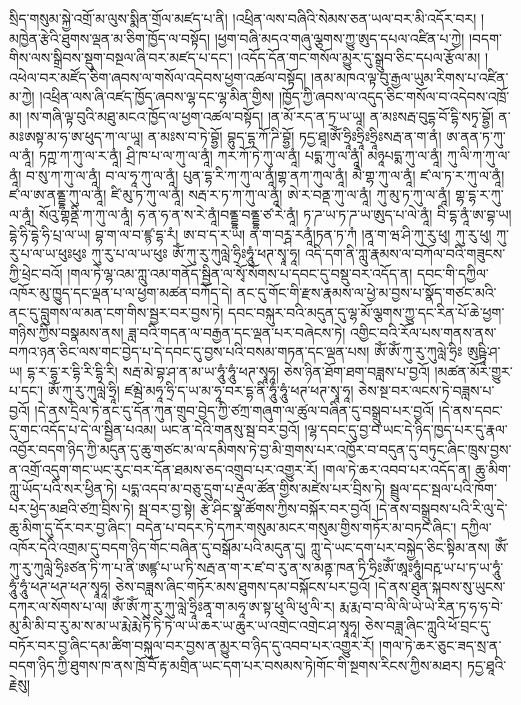 སྲིད་གསུམ་སྐྱེ་འགྲོ་མ་ལུས་སྨིན་གྲོལ་མཛད་པ་ནི། །འཕྲིན་ལས་བཞིའི་སེམས་ཅན་ཡལ་བར་མི་འདོར་བར། །མཁྱེན་རྩེའི་ཐུགས་ལྡན་མ་ཅིག་ཁྱོད་ལ་བསྟོད། །ཕྱག་བཞི་མདའ་གཞུ་ལྕགས་ཀྱུ་ཨུད་དཔལ་འཛིན་པ་ཀྱེ། །བདག་གིས་ལས་སྒྲིབས་སྡུག་བསྔལ་ཞི་བར་མཛད་པ་དང་། །འདོད་དོན་གང་གསོལ་མྱུར་དུ་སྒྲུབ་ཅིང་དཔལ་རྩོལ་མ། །འཕེལ་བར་མཛོད་ཅིག་ཞབས་ལ་གསོལ་འདེབས་ཕྱག་འཚལ་བསྟོད། །ནམ་མཁའ་ལྟ་བུ་རྒྱལ་ཡུམ་རིགས་པ་འཛིན་མ་ཀྱེ། །འཕྲིན་ལས་ཞི་འཛད་ཁྱོད་ཞབས་ལྷ་དང་ལྷ་མིན་གྱིས། །ཁྱོད་ཀྱི་ཞབས་ལ་འདུད་ཅིང་གསོལ་བ་འདེབས་འཁྲོ་མ། །ས་གཞི་ལྟ་བུའི་མཐུ་མངའ་ཁྱོད་ལ་ཕྱག་འཚལ་བསྟོད། །ན་མོ་རད་ན་ཏྲ་ཡ་ཡཱ། ན་མཿསརྦ་བུདྷ་བོ་དྷི་སཏྭ་བྷྱོ། ན་མཿཨསྟ་མ་ཧ་ཨ་ཕུད་ཀ་ལ་ཡཱ། ན་མཿས་བ་ཏེ་བྷྱོ། བྷུད་དྷ་ཀོ་ཌི་བྷྱོ། ཏདྱ་ཐཱ།ཨོཾ་ཧྲཱིཿཧྲཱིཿཧྲཱིཿསརྦ་ན་ག་ནཾ། ཨ་ནན་ཏ་ཀུ་ལ་ནཱཾ། ཏཀྵ་ཀ་ཀུ་ལ་ར་ནཱཾ། ཤྲི་ཁ་པ་ལ་ཀུ་ལ་ནཱཾ། ཀར་ཀོ་ཏེ་ཀུ་ལ་ནཱཾ། པདྨ་ཀུ་ལ་ནཱཾ། མཉཱཔདྨ་ཀུ་ལ་ནཱཾ། ཀུ་ལི་ཀ་ཀུ་ལ་ནཱཾ། བ་སུ་ཀ་ཀུ་ལ་ནཱཾ། བ་ལ་ཧཱ་ཀུ་ལ་ནཱཾ། པུན་དྷ་རི་ཀ་ཀུ་ལ་ནཱཾ།གྷ་ནཀ་ཀུལ་ནཱཾ། མཻ་གྷ་ཀུ་ལ་ནཱཾ། ཛ་ལ་ཏ་ར་ཀུ་ལ་ནཱཾ། ཛ་ལ་ཨ་ནནྡྷ་ཀུ་ལ་ནཱཾ། ཛི་མུ་ཏ་ཀུ་ལ་ནཱཾ། སརྦ་ར་ཏ་ཀ་ཀུ་ལ་ནཱཾ། ཨེ་ར་བནྡ་ཀུ་ལ་ནཱཾ། ཀུ་མུ་ཏ་ཀུ་ལ་ནཱཾ། གྷ་དྷ་ར་ཀུ་ལ་ནཱཾ། སོའུ་གྷནྡི་ཀ་ཀུ་ལ་ནཱཾ། ཧ་ན་ཧ་ན་ས་རེ་ནཱཾ།བནྡྷ་བནྡྷ་ཙ་རེ་ནཱཾ། ཏ་ཌ་ཡ་ཏ་ཌ་ཡ་ཨུད་པ་ལེ་ནཱཾ། བི་དྷ་ནཱཾ་ཨ་བྷ་ཡ། དྷེ་ཧི་དྷེ་ཧི་པྲ་ལ་ཡ། བྷ་ག་ལ་བ་ཛྙ་དྷ་རཾ། ཨ་བ་ད་ར་ཡ། ན་ག་བཪྴ་རནཱཾ།ཏན་ཏ་ཀཾ །ནཱ་ག་ཝ་ཤི་ཀུ་རུ་ཕུ། ཀུ་རུ་ཕུ། ཀུ་རུ་པ་ལ་ཡ་ཕུཿཕུཿ ཀུ་རུ་པ་ལ་ཡ་ཕུཿ ཨོཾ་ཀུ་རུ་ཀུལླེ་ཧྲིཿཧཱུཾ་ཕཊ་སྭཱ་ཧཱ། འདི་དག་ནི་ཀླུ་རྣམས་ལ་བཀོལ་བའི་གཟུངས་ཀྱི་ཕྲེང་བའོ། །གལ་ཏེ་ལྷ་འམ་ཀླུ་འམ་གནོད་སྦྱིན་ལ་སྭོ་སོགས་པ་དབང་དུ་བསྡུ་བར་འདོད་ན། དབང་གི་དཀྱིལ་འཁོར་མུ་ཁྱུད་དང་ལྡན་པ་ལ་ཕྱག་མཚན་བཀོད་དེ། ནང་དུ་གོང་གི་རྫས་རྣམས་ལ་ཕྱེ་མ་བྱས་པ་སྣོད་གཙང་མའི་ནང་དུ་བླུགས་ལ་མན་ངག་གིས་སྦྱར་བར་བྱས་ཏེ། དབང་བསྐུར་བའི་མདུན་དུ་ལྷ་མོ་ལྕགས་ཀྱུ་དང་རིན་པོ་ཆེ་ཕྱག་གཉིས་ཀྱིས་བསྣམས་ནས། ཟླ་བའི་གདན་ལ་བརྒྱན་དང་ལྡན་པར་བཞེངས་ཏེ། འགྱིང་བའི་རོལ་པས་གནས་ནས་བཀའ་ཉན་ཅིང་ལས་གང་བྱེད་པ་དེ་དབང་དུ་བྱས་པའི་བསམ་གཏན་དང་ལྡན་པས། ཨོཾ་ཨོཾ་ཀུ་རུ་ཀུལླེ་ཧྲིཿ ཨུཥྟཱི་ཤ་ཡ། དྷ་ར་དྷ་ར་དྷི་རི་དྷི་རི། སརྦ་མེ་བྷ་ཤ་ན་མ་ཡ་ཧཱུཾ་ཧཱུཾ་ཕཊ་སྭཱཧཱ། ཅེས་ཉིན་ཐོག་ཐག་བཟླས་པ་བྱའོ། །མཚན་མོར་གྱུར་པ་དང་། ཨོཾ་ཀུ་རུ་ཀུལླེ་ཧྲཱི། ཛམྦེ་མཧཱ་ཧྲི་ད་ཡ་མ་ཧཱ་བར་དྷ་ནི་ཧཱུཾ་ཧཱུཾ་ཕཊ་ཕཊ་སྭཱ་ཧཱ། ཅེས་སྔ་བར་ལངས་ཏེ་བཟླས་པ་བྱའོ། །དེ་ནས་དྲིལ་ཏེ་ནང་དུ་དོན་ཀུན་གྲུབ་བྱེད་ཀྱི་ཙཀྲ་གཞུག་ལ་ཚུལ་བཞིན་དུ་བསྒྲུབ་པར་བྱའོ། །དེ་ནས་དབང་དུ་གང་འདོད་པ་དེ་ལ་སྦྱིན་པའམ། ཡང་ན་དེའི་གནསུ་སྦ་བར་བྱའོ། །ལྷ་དབང་དུ་བྱ་བ་ཡང་དེ་ཉིད་ཁྱད་པར་དུ་རྣལ་འབྱོར་བདག་ཉིད་ཀྱི་མདུན་དུ་ཆུ་གཙང་མ་ལ་དམིགས་ཏེ་བྱ་མི་གྲགས་པར་འཁྱོར་བ་བདུན་དུ་བཏུང་ཞིང་ཁྲུས་བྱས་ན་འགྲོ་འདུག་གང་ཡང་རུང་བར་དོན་ཐམས་ཅད་འགྲུབ་པར་འགྱུར་རོ། །གལ་ཏེ་ཆར་འབབ་པར་འདོད་ན། ཆུ་མིག་ཀླུ་ཡོད་པའི་སར་ཕྱིན་ཏེ། པདྨ་འདབ་མ་བཅུ་དྲུག་པ་རྡུལ་ཚོན་གྱིས་མཛེས་པར་བྲིས་ཏེ། སྦྲུལ་དང་སྦལ་པའི་ཁོག་པར་ཕྱེད་མཐའི་ཙཀྲ་བྲིས་ཏེ། སྦ་བར་བྱ་སྟེ། རྩེ་ཤིང་སྣ་ཚོགས་ཀྱིས་བསྐོར་བར་བྱའོ། །དེ་ནས་བསྒྲུབས་པའི་རི་ལུ་དེ་ཆུ་མིག་དུ་དོར་བར་བྱ་ཞིང་། བདེན་པ་བདར་ཏེ་དཀར་གསུམ་མངར་གསུམ་གྱིས་གཏོར་མ་བཏང་ཞིང་། དཀྱིལ་འཁོར་དེའི་འགྲམ་དུ་བདག་ཉིད་གོང་བཞིན་དུ་བསྒོམ་པའི་མདུན་དུ། ཀླུ་དེ་ཡང་དག་པར་བསྐྱེད་ཅིང་སྟིམ་ནས། ཨོཾ་ཀུ་རུ་ཀུལླེ་ཧྲིཿཙན་ཏི་ཀ་པ་ནི་ཨཛྙ་པ་ཡ་ཏི་སརྦ་ན་ག་ར་ཛ་བ་རུ་ན་ས་མནྟ་ཁན་ཏི་ཧྲིཿཨོཾ་ཨཱཿཧཱུཾ།བརྵ་ཡ་པ་ཏ་ཡ་ཧཱུཾ་ཧཱུཾ་ཧཱུཾ་ཕཊ་ཕཊ་ཕཊ་སྭཱཧཱ། ཅེས་བཟླས་ཞིང་གཏོར་མས་ཐུགས་དམ་བསྐོངས་པར་བྱའོ། །དེ་ནས་ཐུན་སྐབས་སུ་ཡུངས་དཀར་ལ་སོགས་པ་ལ། ཨོཾ་ཨོཾ་ཀུ་རུ་ཀུ་ལླེ་ཧྲཱིཿནཱ་ག་མཧཱ་ཨ་སྟ་ཕུ་ལི་ཕུ་ལི་ར། རྨ་རྨ་བ་བ་ལི་ལི་ཡེ་ཡེ་རིན་ཏ་ཧ་ཧ་བེ་མུ་མི་མི་བ་རུ་མ་ས་མ་ཡ་རྨེ་རྨེ་ཏི་ཏི་ཏེ་ལ་ཡ་ཆར་ཡ་ཆུར་ཡ་འགྲེང་འགྲེང་ཤ་སྭཱཧཱ། ཅེས་བཟླ་ཞིང་ཀླུའི་ཕོ་བྲང་དུ་བཏོར་བར་བྱ་ཞིང་དམ་ཚིག་བསྐུལ་བར་བྱས་ན་མྱུར་བ་ཉིད་དུ་འབབ་པར་འགྱུར་རོ། །གལ་ཏེ་ཆར་ཅུང་ཟད་སྲ་ན་བདག་ཉིད་ཀྱི་ཐུགས་ཁ་ནས་ཁྲོ་བོ་རྟ་མགྲིན་ཡང་དག་པར་བསམས་ཏེ།གོང་གི་སྔགས་རིངས་ཀྱིས་མཐར། ཏདྱ་ཐཱའི་རྗེསུ། 